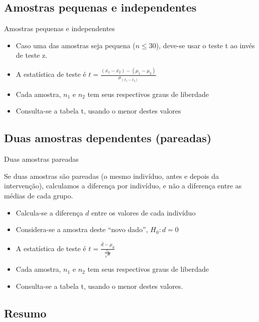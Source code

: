 \documentclass{beamer}
\begin{document}
\subsection{Amostras pequenas e independentes}

\begin{frame}{Amostras pequenas e independentes}
  \begin{itemize}
  \item Caso uma das amostras seja pequena ($n\le30$), deve-se usar o teste t ao invés de teste z.
  \item A estatística de teste é
    $t = \frac{ (\bar{x_1} - \bar{x_2}) - (\mu_1 - \mu_2)
    }{\sigma_{(\bar{x_1} - \bar{x_2})}}$
  \item Cada amostra, $n_1$ e $n_2$ tem seus respectivos graus de liberdade
  \item Consulta-se a tabela t, usando o menor destes valores
  \end{itemize}
\end{frame}

\subsection{Duas amostras dependentes (pareadas)}

\begin{frame}{Duas amostras pareadas}
  \begin{block}{}
  Se duas amostras são pareadas (o \alert{mesmo} indivíduo, antes e depois da intervenção), calculamos a diferença \alert{por indivíduo}, e não a diferença entre as médias de cada grupo.
  \end{block}

  \begin{itemize}
  \item Calcula-se a diferença $d$ entre os valores de cada indivíduo
 \item Considera-se a amostra deste ``novo dado'', $H_0: d=0$
  \item A estatística de teste é
    $t = \frac{\bar{d} - \mu_d}{\frac{s_d}{\sqrt{n}}}$
  \item Cada amostra, $n_1$ e $n_2$ tem seus respectivos graus de liberdade
  \item Consulta-se a tabela t, usando o menor destes valores.
  \end{itemize}
\end{frame}

\subsection{Resumo}
\end{document}
